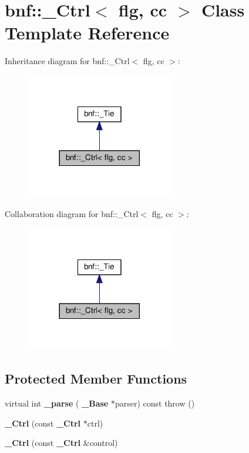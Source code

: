 \section{bnf\+:\+:\+\_\+\+Ctrl$<$ flg, cc $>$ Class Template Reference}
\label{classbnf_1_1___ctrl}


Inheritance diagram for bnf\+:\+:\+\_\+\+Ctrl$<$ flg, cc $>$\+:
\nopagebreak
\begin{figure}[H]
\begin{center}
\leavevmode
\includegraphics[width=182pt]{classbnf_1_1___ctrl__inherit__graph}
\end{center}
\end{figure}


Collaboration diagram for bnf\+:\+:\+\_\+\+Ctrl$<$ flg, cc $>$\+:
\nopagebreak
\begin{figure}[H]
\begin{center}
\leavevmode
\includegraphics[width=182pt]{classbnf_1_1___ctrl__coll__graph}
\end{center}
\end{figure}
\subsection*{Protected Member Functions}
\begin{DoxyCompactItemize}
\item 
\mbox{\label{classbnf_1_1___ctrl_adbaef05a183046207b717abbc5e3e815}} 
virtual int {\bfseries \+\_\+parse} (\textbf{ \+\_\+\+Base} $\ast$parser) const  throw ()
\item 
\mbox{\label{classbnf_1_1___ctrl_a176955339cc1cac3ce06070a3d2f3d90}} 
{\bfseries \+\_\+\+Ctrl} (const \textbf{ \+\_\+\+Ctrl} $\ast$ctrl)
\item 
\mbox{\label{classbnf_1_1___ctrl_aa6195bf31c3d0c9496d7e2e83cc923c4}} 
{\bfseries \+\_\+\+Ctrl} (const \textbf{ \+\_\+\+Ctrl} \&control)
\end{DoxyCompactItemize}
